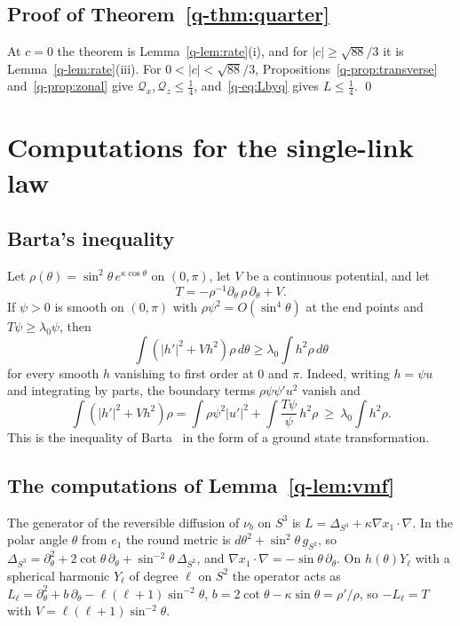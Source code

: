 \documentclass[aps,prd,twocolumn,superscriptaddress,nofootinbib,longbibliography,floatfix,amsmath,amssymb,10pt]{revtex4-2}
\theoremstyle{definition}
\theoremstyle{remark}
\begin{document}
\subsection{Proof of Theorem~\ref{q-thm:quarter}}

At $c=0$ the theorem is Lemma~\ref{q-lem:rate}(i), and for $|c|\ge\sqrt{88}/3$
it is Lemma~\ref{q-lem:rate}(iii). For $0<|c|<\sqrt{88}/3$,
Propositions~\ref{q-prop:transverse} and~\ref{q-prop:zonal} give $\mathcal Q_x,
\mathcal Q_z\le\frac14$, and~\eqref{q-eq:Lbyq} gives $L\le\frac14$. \qed


\section{Computations for the single-link law}\label{app:vmfcomp}

\subsection{Barta's inequality}

Let $\rho(\theta)=\sin^2\theta\,e^{\kappa\cos\theta}$ on $(0,\pi)$, let $V$
be a continuous potential, and let
\[
T=-\rho^{-1}\partial_\theta\,\rho\,\partial_\theta+V .
\] If $\psi>0$ is smooth on $(0,\pi)$ with
$\rho\psi^2=O(\sin^4\theta)$ at the end points and $T\psi\ge\lambda_0\psi$,
then
\[
\int(|h'|^2+Vh^2)\rho\,d\theta\ge\lambda_0\int h^2\rho\,d\theta
\]
for every smooth $h$ vanishing to first order at $0$ and $\pi$. Indeed, writing
$h=\psi u$ and integrating by parts, the boundary terms $\rho\psi\psi'u^2$
vanish and
\[
\int(|h'|^2+Vh^2)\rho=\int\rho\psi^2|u'|^2+\int\frac{T\psi}\psi\,h^2\rho
\ \ge\ \lambda_0\int h^2\rho .
\]
This is the inequality of Barta~\cite{Bar37} in the form of a ground state
transformation.

\subsection{The computations of Lemma~\ref{q-lem:vmf}}

The generator of the reversible diffusion of $\nu_b$ on $S^3$ is
$L=\Delta_{S^3}+\kappa\nabla x_1\cdot\nabla$. In the polar angle $\theta$
from $e_1$ the round metric is $d\theta^2+\sin^2\theta\,g_{S^2}$, so
$\Delta_{S^3}=\partial_\theta^2+2\cot\theta\,\partial_\theta+\sin^{-2}\theta\,
\Delta_{S^2}$, and $\nabla x_1\cdot\nabla=-\sin\theta\,\partial_\theta$. On
$h(\theta)Y_\ell$ with a spherical harmonic $Y_\ell$ of degree $\ell$ on $S^2$
the operator acts as $L_\ell=\partial_\theta^2+b\,\partial_\theta-\ell(\ell+1)
\sin^{-2}\theta$, $b=2\cot\theta-\kappa\sin\theta=\rho'/\rho$, so
$-L_\ell=T$ with $V=\ell(\ell+1)\sin^{-2}\theta$.
\end{document}
